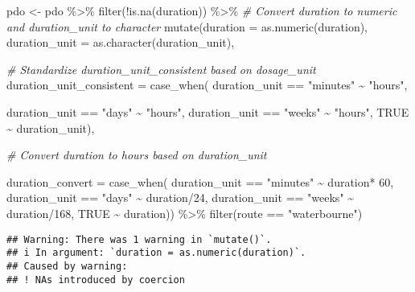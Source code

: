 \documentclass[
]{article}
\newenvironment{Shaded}{\begin{snugshade}}{\end{snugshade}}
\newcommand{\AttributeTok}[1]{\textcolor[rgb]{0.77,0.63,0.00}{#1}}
\newcommand{\CommentTok}[1]{\textcolor[rgb]{0.56,0.35,0.01}{\textit{#1}}}
\newcommand{\ConstantTok}[1]{\textcolor[rgb]{0.00,0.00,0.00}{#1}}
\newcommand{\DecValTok}[1]{\textcolor[rgb]{0.00,0.00,0.81}{#1}}
\newcommand{\FunctionTok}[1]{\textcolor[rgb]{0.00,0.00,0.00}{#1}}
\newcommand{\NormalTok}[1]{#1}
\newcommand{\OtherTok}[1]{\textcolor[rgb]{0.56,0.35,0.01}{#1}}
\newcommand{\SpecialCharTok}[1]{\textcolor[rgb]{0.00,0.00,0.00}{#1}}
\newcommand{\StringTok}[1]{\textcolor[rgb]{0.31,0.60,0.02}{#1}}
\begin{document}
\begin{Shaded}
\begin{Highlighting}[]
\NormalTok{pdo }\OtherTok{\textless{}{-}}\NormalTok{ pdo }\SpecialCharTok{\%\textgreater{}\%} 
  \FunctionTok{filter}\NormalTok{(}\SpecialCharTok{!}\FunctionTok{is.na}\NormalTok{(duration)) }\SpecialCharTok{\%\textgreater{}\%}
  \CommentTok{\# Convert duration to numeric and duration\_unit to character }
  \FunctionTok{mutate}\NormalTok{(}\AttributeTok{duration =} \FunctionTok{as.numeric}\NormalTok{(duration),}
         \AttributeTok{duration\_unit =} \FunctionTok{as.character}\NormalTok{(duration\_unit),}
         
  \CommentTok{\# Standardize duration\_unit\_consistent based on dosage\_unit }
  \AttributeTok{duration\_unit\_consistent =} \FunctionTok{case\_when}\NormalTok{(}
\NormalTok{          duration\_unit }\SpecialCharTok{==} \StringTok{"minutes"} \SpecialCharTok{\textasciitilde{}} \StringTok{"hours"}\NormalTok{,}
        
\NormalTok{          duration\_unit }\SpecialCharTok{==} \StringTok{"days"} \SpecialCharTok{\textasciitilde{}} \StringTok{"hours"}\NormalTok{,}
\NormalTok{          duration\_unit }\SpecialCharTok{==} \StringTok{"weeks"} \SpecialCharTok{\textasciitilde{}} \StringTok{"hours"}\NormalTok{,}
           \ConstantTok{TRUE} \SpecialCharTok{\textasciitilde{}}\NormalTok{ duration\_unit),}
  
  \CommentTok{\# Convert duration to hours based on duration\_unit}
  
  \AttributeTok{duration\_convert =} \FunctionTok{case\_when}\NormalTok{(}
\NormalTok{    duration\_unit }\SpecialCharTok{==} \StringTok{"minutes"} \SpecialCharTok{\textasciitilde{}}\NormalTok{ duration}\SpecialCharTok{*} \DecValTok{60}\NormalTok{,}
\NormalTok{    duration\_unit }\SpecialCharTok{==} \StringTok{"days"} \SpecialCharTok{\textasciitilde{}}\NormalTok{ duration}\SpecialCharTok{/}\DecValTok{24}\NormalTok{, }
\NormalTok{    duration\_unit }\SpecialCharTok{==} \StringTok{"weeks"} \SpecialCharTok{\textasciitilde{}}\NormalTok{ duration}\SpecialCharTok{/}\DecValTok{168}\NormalTok{,}
    \ConstantTok{TRUE} \SpecialCharTok{\textasciitilde{}}\NormalTok{ duration)) }\SpecialCharTok{\%\textgreater{}\%} 
  \FunctionTok{filter}\NormalTok{(route }\SpecialCharTok{==} \StringTok{"waterbourne"}\NormalTok{)}
\end{Highlighting}
\end{Shaded}

\begin{verbatim}
## Warning: There was 1 warning in `mutate()`.
## i In argument: `duration = as.numeric(duration)`.
## Caused by warning:
## ! NAs introduced by coercion
\end{verbatim}
\end{document}
